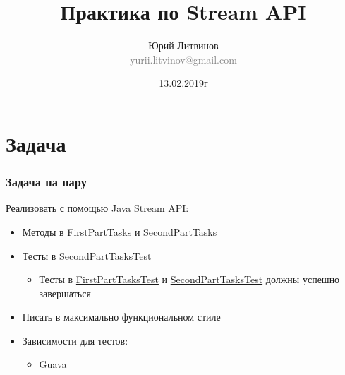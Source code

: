 \documentclass[xetex,mathserif,serif]{beamer}
\title{Практика по Stream API}
\author[Юрий Литвинов]{Юрий Литвинов\\\small{\textcolor{gray}{yurii.litvinov@gmail.com}}}
\date{13.02.2019г}
\begin{document}
	\frame{\titlepage}

	\section{Задача}

	\begin{frame}
		\frametitle{Задача на пару}
		Реализовать с помощью Java Stream API:
		\begin{itemize}
			\item Методы в \href{https://gist.github.com/yurii-litvinov/527f289e454c296f7505ccaf79873428\#file-firstparttasks-java}{FirstPartTasks} и \href{https://gist.github.com/yurii-litvinov/527f289e454c296f7505ccaf79873428\#file-secondparttasks-java}{SecondPartTasks}
			\item Тесты в \href{https://gist.github.com/yurii-litvinov/527f289e454c296f7505ccaf79873428\#file-secondparttaskstest-java}{SecondPartTasksTest}
			\begin{itemize}
				\item Тесты в \href{https://gist.github.com/yurii-litvinov/527f289e454c296f7505ccaf79873428\#file-firstparttaskstest-java}{FirstPartTasksTest} и \href{https://gist.github.com/yurii-litvinov/527f289e454c296f7505ccaf79873428\#file-secondparttaskstest-java}{SecondPartTasksTest} должны успешно завершаться
			\end{itemize}
			\item Писать в максимально функциональном стиле
			\item Зависимости для тестов:
			\begin{itemize}
				\item \href{https://mvnrepository.com/artifact/com.google.guava/guava/27.0.1-jre}{Guava}
			\end{itemize}
		\end{itemize}
	\end{frame}
\end{document}
